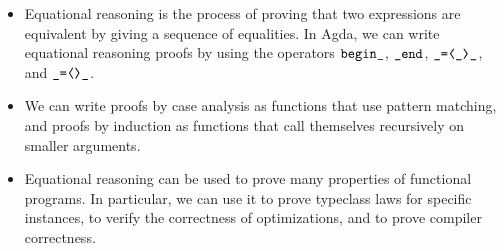 \documentclass[a4paper,UKenglish]{tufte-handout}
\theoremstyle{definition}
\newcommand\fun[1]{{\AgdaFunction{#1}}}
\begin{document}
\begin{itemize}
  \item Equational reasoning is the process of proving that two
expressions are equivalent by giving a sequence of equalities. In
Agda, we can write equational reasoning proofs by using the operators
$\fun{begin\_}$, $\fun{\_end}$, $\fun{\_=⟨\_⟩\_}$, and
$\fun{\_=⟨⟩\_}$.
  \item We can write proofs by case analysis as functions that use
pattern matching, and proofs by induction as functions that call
themselves recursively on smaller arguments.
  \item Equational reasoning can be used to prove many properties of
functional programs. In particular, we can use it to prove typeclass
laws for specific instances, to verify the correctness of
optimizations, and to prove compiler correctness.
\end{itemize}


%
%
%
%
%
%
%
%
%
%
%
\end{document}
